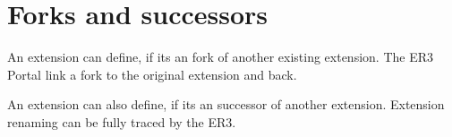 \section[sec:forks]{Forks and successors}

An extension can define, if its an fork of another existing extension.
The ER3 Portal link a fork to the original extension and back.

An extension can also define, if its an successor of another extension.
Extension renaming can be fully traced by the ER3.
